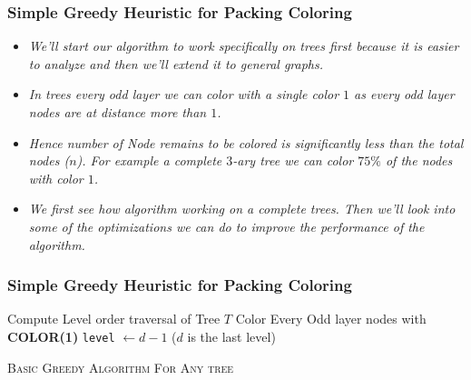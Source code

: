 \begin{frame}
    \frametitle{Simple Greedy Heuristic for Packing Coloring}

    \begin{itemize}
        \item \textit{We'll start our algorithm to work specifically on trees first because it is easier to analyze and then we'll extend it to general graphs.} \pause[]
        \item \textit{In trees every odd layer we can color with a single color $1$ as every odd layer nodes are at distance more than $1$.}\pause[]
        \item \textit{Hence number of Node remains to be colored is significantly less than the total nodes ($n$). For example a complete $3$-ary tree we can color $75\%$ of the nodes with color $1$.}\pause[]
        \item \textit{We first see how algorithm working on a complete trees. Then we'll look into some of the optimizations we can do to improve the performance of the algorithm.}
    \end{itemize}

\end{frame}

\begin{frame}
    \frametitle{Simple Greedy Heuristic for Packing Coloring}

    \begin{algorithm}[H]\label{alg:1}
    
        \BlankLine
        Compute Level order traversal of Tree $T$\;
        Color Every Odd layer nodes with \textbf{COLOR(1)}\;
        \texttt{level} $\gets d - 1$ ($d$ is the last level)\;
        \caption{\textsc{Basic Greedy Algorithm For Any tree}}
    \end{algorithm}

\end{frame}


